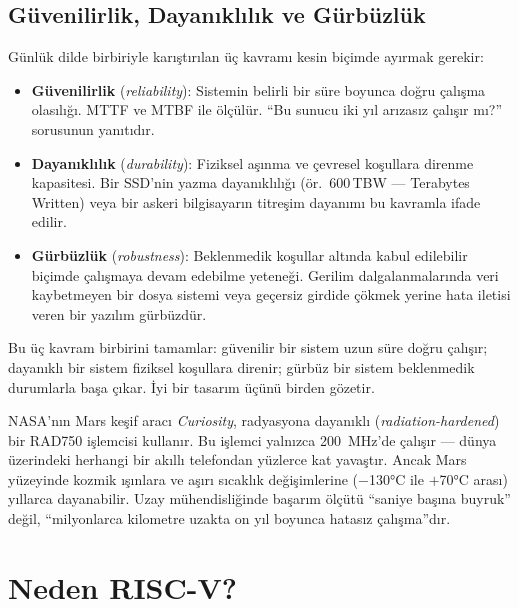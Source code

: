 \subsection{Güvenilirlik, Dayanıklılık ve Gürbüzlük}
\label{subsec:guvenilirlik-dayaniklilik-gurbuzluk}

Günlük dilde birbiriyle karıştırılan üç kavramı kesin biçimde ayırmak gerekir:
\begin{itemize}
    \item \textbf{Güvenilirlik} (\emph{reliability}): Sistemin belirli bir süre boyunca doğru çalışma olasılığı. MTTF ve MTBF ile ölçülür. ``Bu sunucu iki yıl arızasız çalışır mı?'' sorusunun yanıtıdır.
    \item \textbf{Dayanıklılık} (\emph{durability}): Fiziksel aşınma ve çevresel koşullara direnme kapasitesi. Bir SSD'nin yazma dayanıklılığı (ör.\ 600\,TBW --- Terabytes Written) veya bir askeri bilgisayarın titreşim dayanımı bu kavramla ifade edilir.
    \item \textbf{Gürbüzlük} (\emph{robustness}): Beklenmedik koşullar altında kabul edilebilir biçimde çalışmaya devam edebilme yeteneği. Gerilim dalgalanmalarında veri kaybetmeyen bir dosya sistemi veya geçersiz girdide çökmek yerine hata iletisi veren bir yazılım gürbüzdür.
\end{itemize}

Bu üç kavram birbirini tamamlar: güvenilir bir sistem uzun süre doğru çalışır; dayanıklı bir sistem fiziksel koşullara direnir; gürbüz bir sistem beklenmedik durumlarla başa çıkar. İyi bir tasarım üçünü birden gözetir.

\begin{bilginot}
NASA'nın Mars keşif aracı \emph{Curiosity}, radyasyona dayanıklı (\emph{radiation-hardened}) bir RAD750 işlemcisi kullanır. Bu işlemci yalnızca 200~MHz'de çalışır --- dünya üzerindeki herhangi bir akıllı telefondan yüzlerce kat yavaştır. Ancak Mars yüzeyinde kozmik ışınlara ve aşırı sıcaklık değişimlerine ($-$130°C ile $+$70°C arası) yıllarca dayanabilir. Uzay mühendisliğinde başarım ölçütü ``saniye başına buyruk'' değil, ``milyonlarca kilometre uzakta on yıl boyunca hatasız çalışma''dır.
\end{bilginot}


\section{Neden RISC-V?}
\label{sec:neden-riscv}

